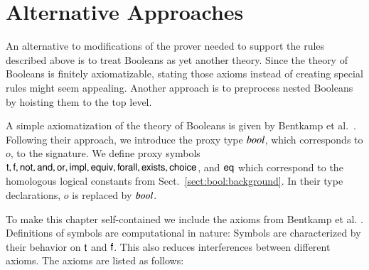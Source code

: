 \section{Alternative Approaches} 
\label{sect:bool:alternative}

An alternative to modifications of the prover needed to support the rules
described above is to treat Booleans as yet another theory. Since the theory of Booleans
is finitely axiomatizable, stating those axioms instead of creating special
rules might seem appealing. Another approach
is to preprocess nested Booleans by hoisting them to the top level.

A simple axiomatization of the theory of Booleans is given by Bentkamp et al.\ \cite{bbtvw-21-sup-lam}.
Following their approach, we introduce the proxy type ${\mathit{bool}}$, which corresponds to $o$, to the
signature. We define proxy symbols $\mathsf{t}, \mathsf{f}, \mathsf{not}, \mathsf{and}, \mathsf{or},
\mathsf{impl}, \mathsf{equiv},\allowbreak \mathsf{forall}, \mathsf{exists}, \mathsf{choice}$, and $\mathsf{eq}$ which 
correspond to the homologous logical constants from Sect.~\ref{sect:bool:background}. In their
type declarations, $o$ is replaced by ${\mathit{bool}}$.
  
To make this chapter self-contained we include the axioms from Bentkamp et al. \cite{bbtvw-21-sup-lam}.
Definitions of symbols are computational in nature: Symbols are characterized by their behavior on $\mathsf{t}$ and $\mathsf{f}$.
This also reduces interferences between different axioms. The axioms are listed as follows:

\kern\abovedisplayskip
 

